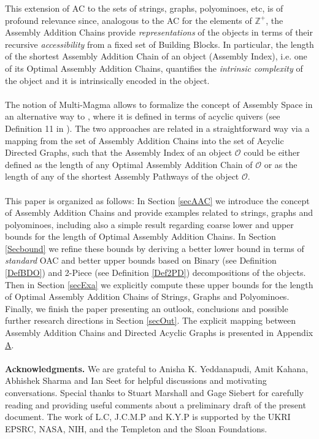 \documentclass[letterpaper,12pt]{article}
\theoremstyle{definition}
\begin{document}
This extension of AC to the sets of strings, graphs, polyominoes, etc, is of profound relevance since, analogous to the AC for the elements of $\mathbb{Z}^+$, the Assembly Addition Chains provide \textit{representations} of the objects in terms of their recursive \textit{accessibility} from a fixed set of Building Blocks. In particular, the length of the shortest Assembly Addition Chain of an object (Assembly Index), i.e. one of its Optimal Assembly Addition Chains, quantifies the \textit{intrinsic complexity} of the object and it is intrinsically encoded in the object. \\\\ 
The notion of Multi-Magma allows to formalize the concept of Assembly Space in an alternative way to \cite{Marshall2022FormalisingTP}, where it is defined in terms of acyclic quivers (see Definition 11 in \cite{Marshall2022FormalisingTP}). The two approaches are related in a straightforward way via a mapping from the set of Assembly Addition Chains into the set of Acyclic Directed Graphs, such that the Assembly Index of an object $\mathscr{O}$ could be either defined as the length of any Optimal Assembly Addition Chain of $\mathscr{O}$ or as the length of any of the shortest Assembly Pathways of the object $\mathscr{O}$.         \\\\
This paper is organized as follows: In Section \ref{secAAC} we introduce the concept of Assembly Addition Chains and provide examples related to strings, graphs and polyominoes, including also a simple result regarding coarse lower and upper bounds for the length of Optimal Assembly Addition Chains. In Section  \ref{Secbound} we refine these bounds by deriving a better lower bound in terms of \textit{standard} OAC and better upper bounds based on Binary (see Definition \ref{DefBDO}) and 2-Piece (see Definition \ref{Def2PD}) decompositions of the objects. Then in Section \ref{secExa} we explicitly compute these upper bounds for the length of Optimal Assembly Addition Chains of Strings, Graphs and Polyominoes. Finally, we finish the paper presenting an outlook, conclusions and possible further research directions in Section \ref{secOut}. The explicit mapping between Assembly Addition Chains and Directed Acyclic Graphs is presented in Appendix \href{sec:AppA}{A}.\\\\
\textbf{Acknowledgments.} We are grateful to Anisha K. Yeddanapudi, Amit Kahana, Abhishek Sharma and Ian Seet for helpful discussions and motivating conversations. Special thanks to Stuart Marshall and Gage Siebert for carefully reading and providing useful comments about a preliminary draft of the present document. The work of L.C, J.C.M.P and K.Y.P is supported by the UKRI EPSRC, NASA, NIH, and the Templeton and the Sloan Foundations.
\end{document}
